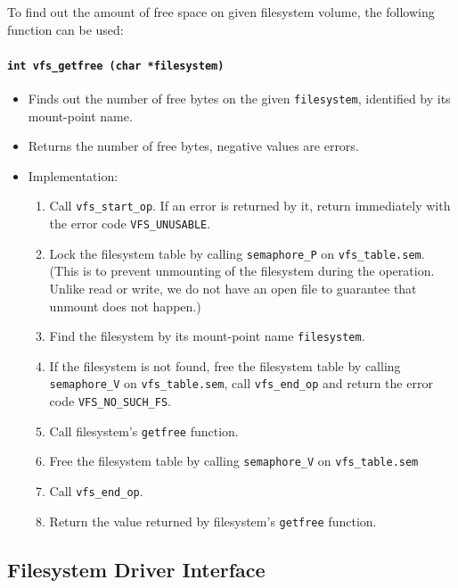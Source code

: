 \documentclass[twoside,a4paper]{report}
\makeatletter
\newenvironment{function}[3]{%
\paragraph{\texttt{#1 {\textbf{#2}} (#3)}}%
\index{#2@\texttt{#2}}%
\begin{itemize}%
}{%
\end{itemize}%
}
\makeatother
\begin{document}
To find out the amount of free space on given filesystem volume, the
following function can be used:

\begin{function}{int}{vfs\_getfree}{char *filesystem}

\item Finds out the number of free bytes on the given
\texttt{filesystem}, identified by its mount-point name.

\item Returns the number of free bytes, negative values are errors.

\item Implementation:
\begin{enumerate}

\item Call \texttt{vfs\_start\_op}. If an error is returned by it,
 return immediately with the error code \texttt{VFS\_UNUSABLE}.

\item Lock the filesystem table by calling \texttt{semaphore\_P} on
\texttt{vfs\_table.sem}. (This is to prevent unmounting of the
filesystem during the operation. Unlike read or write, we do not have
an open file to guarantee that unmount does not happen.)

\item Find the filesystem by its mount-point name \texttt{filesystem}.

\item If the filesystem is not found, free the filesystem table by
calling \texttt{semaphore\_V} on \texttt{vfs\_table.sem}, call
\texttt{vfs\_end\_op} and return the error code
\texttt{VFS\_NO\_SUCH\_FS}.

\item Call filesystem's \texttt{getfree} function.

\item Free the filesystem table by calling \texttt{semaphore\_V} on
\texttt{vfs\_table.sem}

\item Call \texttt{vfs\_end\_op}.

\item Return the value returned by filesystem's \texttt{getfree} function.

\end{enumerate}
\end{function}



\subsection{Filesystem Driver Interface}
\end{document}
